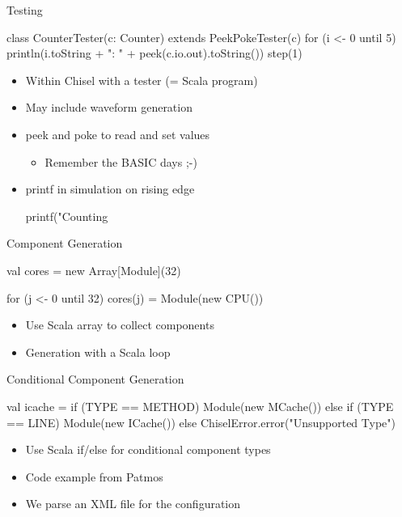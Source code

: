\documentclass[xcolor=pdflatex,dvipsnames,table]{beamer}
\begin{document}
\begin{frame}[fragile]{Testing}
\begin{chisel}
class CounterTester(c: Counter) extends PeekPokeTester(c) {
  for (i <- 0 until 5) {
    println(i.toString + ": " + peek(c.io.out).toString())
    step(1)
  }
}
\end{chisel}
\begin{itemize}
\item Within Chisel with a tester (= Scala program)
\item May include waveform generation
\item peek and poke to read and set values
\begin{itemize}
\item Remember the BASIC days ;-)
\end{itemize}
\item printf in simulation on rising edge
\begin{chisel}
printf("Counting %
\end{chisel}
\end{itemize}
\end{frame}

\begin{frame}[fragile]{Component Generation}
\begin{chisel}
val cores = new Array[Module](32)

for (j <- 0 until 32)
  cores(j) = Module(new CPU())
\end{chisel}
\begin{itemize}
\item Use Scala array to collect components
\item Generation with a Scala loop
\end{itemize}
\end{frame}

\begin{frame}[fragile]{Conditional Component Generation}
\begin{chisel}
val icache =
  if (TYPE == METHOD)
    Module(new MCache())
  else if (TYPE == LINE)
    Module(new ICache())
  else
    ChiselError.error("Unsupported Type")
\end{chisel}
\begin{itemize}
\item Use Scala if/else for conditional component types
\item Code example from Patmos
\item We parse an XML file for the configuration
\end{itemize}
\end{frame}
\end{document}
